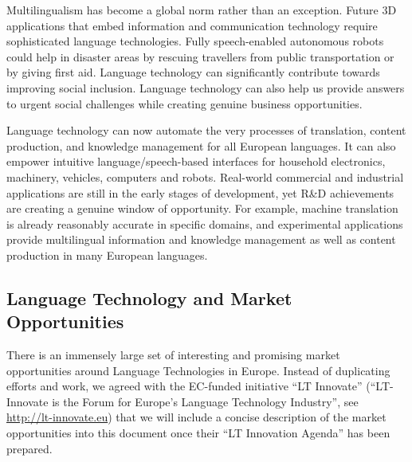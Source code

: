 \documentclass[10pt, plain]{../../metanetpaper}
\begin{document}
\begin{multicols}{2}
Multilingualism has become a global norm rather than an exception. Future 3D applications that embed information and communication technology require sophisticated language technologies. Fully speech-enabled autonomous robots could help in disaster areas by rescuing travellers from public transportation or by giving first aid. Language technology can significantly contribute towards improving social inclusion. Language technology can also help us provide answers to urgent social challenges while creating genuine business opportunities.

Language technology can now automate the very processes of translation, content production, and knowledge management for all European languages. It can also empower intuitive language/speech-based interfaces for household electronics, machinery, vehicles, computers and robots. Real-world commercial and industrial applications are still in the early stages of development, yet R\&D achievements are creating a genuine window of opportunity. For example, machine translation is already reasonably accurate in specific domains, and experimental applications provide multilingual information and knowledge management as well as content production in many European languages. 

\subsection{Language Technology and Market Opportunities}
\label{sec:market-opportunities}

There is an immensely large set of interesting and promising market opportunities around Language Technologies in Europe. Instead of duplicating efforts and work, we agreed with the EC-funded initiative ``LT Innovate'' (``LT-Innovate is the Forum for Europe's Language Technology Industry'', see \url{http://lt-innovate.eu}) that we will include a concise description of the market opportunities into this document once their ``LT Innovation Agenda'' has been prepared.

\end{multicols}

\clearpage


\end{document}
